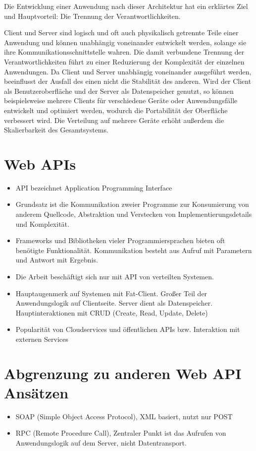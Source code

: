 \par
Die Entwicklung einer Anwendung nach dieser Architektur hat ein erklärtes Ziel und Hauptvorteil: Die Trennung der Verantwortlichkeiten.
\par
Client und Server sind logisch und oft auch physikalisch getrennte Teile einer Anwendung und können unabhängig voneinander entwickelt werden, solange sie ihre Kommunikationsschnittstelle wahren.
Die damit verbundene Trennung der Verantwortlichkeiten führt zu einer Reduzierung der Komplexität der einzelnen Anwendungen.
Da Client und Server unabhängig voneinander ausgeführt werden, beeinflusst der Ausfall des einen nicht die Stabilität des anderen.
Wird der Client als Benutzeroberfläche und der Server als Datenspeicher genutzt, so können beispielsweise mehrere Clients für verschiedene Geräte oder Anwendungsfälle entwickelt und optimiert werden, wodurch die Portabilität der Oberfläche verbessert wird.
Die Verteilung auf mehrere Geräte erhöht außerdem die Skalierbarkeit des Gesamtsystems.

\section{Web APIs}
\begin{itemize}
  \item API bezeichnet Application Programming Interface
  \item Grundsatz ist die Kommunikation zweier Programme zur Konsumierung von anderem Quellcode, Abstraktion und Verstecken von Implementierungsdetails und Komplexität.
  \item Frameworks und Bibliotheken vieler Programmiersprachen bieten oft benötigte Funktionalität. Kommunikation besteht aus Aufruf mit Parametern und Antwort mit Ergebnis.
  \item Die Arbeit beschäftigt sich nur mit API von verteilten Systemen.
  \item Hauptaugenmerk auf Systemen mit Fat-Client. Großer Teil der Anwendungslogik auf Clientseite. Server dient als Datenspeicher. Hauptinteraktionen mit CRUD (Create, Read, Update, Delete)
  \item Popularität von Cloudservices und öffentlichen APIs bzw. Interaktion mit externen Services
\end{itemize}

\section{Abgrenzung zu anderen Web API Ansätzen}
\begin{itemize}
  \item SOAP (Simple Object Access Protocol), XML basiert, nutzt nur POST
  \item RPC (Remote Procedure Call), Zentraler Punkt ist das Aufrufen von Anwendungslogik auf dem Server, nicht Datentransport.
\end{itemize}
